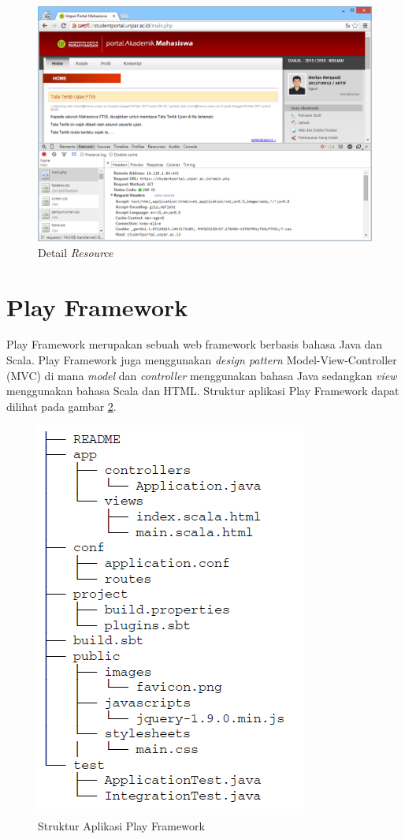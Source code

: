 \begin{figure}
	\centering
	\includegraphics[scale=0.5]{Gambar/network-header}
	\caption{Detail \textit{Resource}} 
	\label{fig:2_network_detail}
\end{figure}

\section{Play Framework}
\label{sec:play}

Play Framework\cite{Leroux:2014} merupakan sebuah web framework berbasis bahasa Java dan Scala. Play Framework juga menggunakan \textit{design pattern} Model-View-Controller (MVC) di mana \textit{model} dan \textit{controller} menggunakan bahasa Java sedangkan \textit{view} menggunakan bahasa Scala dan HTML. Struktur aplikasi Play Framework dapat dilihat pada gambar \ref{fig:2_play_dir}.
\begin{figure}[H]
	\centering
	\includegraphics[scale=0.5]{Gambar/play-dir}
	\caption{Struktur Aplikasi Play Framework} 
	\label{fig:2_play_dir}
\end{figure}

